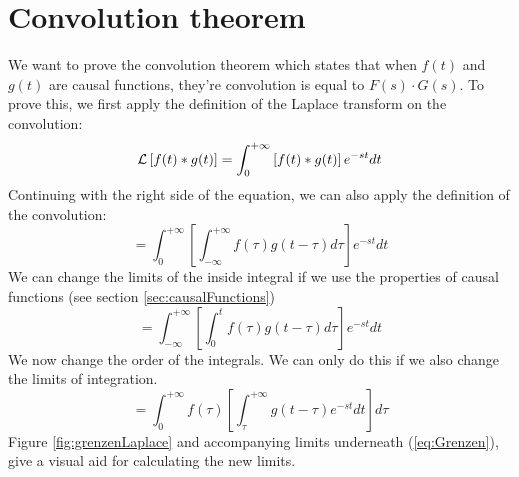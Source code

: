 \documentclass[]{subfiles}
\begin{document}
	\section{Convolution theorem}
	We want to prove the convolution theorem which states that when $f(t)$ and $g(t)$ are causal functions, they're convolution is equal to $F(s)\cdot G(s)$. To prove this, we first apply the definition of the Laplace transform on the convolution:
	\begin{equation*}
		\mathcal{L}\left[ f(t)\ast g(t)\right]  = \int_{0}^{+\infty}\left[ f(t)\ast g(t)\right] e^{-st}dt
	\end{equation*}
	Continuing with the right side of the equation, we can also apply the definition of the convolution:
	\begin{equation*}
		=\int_{0}^{+\infty}\left[ \int_{-\infty}^{+\infty}f(\tau)g(t-\tau)d\tau	\right] e^{-st}dt
	\end{equation*}
	We can change the limits of the inside integral if we use the properties of causal functions (see section \ref{sec:causalFunctions})
	\begin{equation*}
		=\int_{-\infty}^{+\infty}\left[ \int_{0}^{t}f(\tau)g(t-\tau)d\tau\right] e^{-st}dt
	\end{equation*}
	We now change the order of the integrals. We can only do this if we also change the limits of integration.
	\begin{equation*}
		=\int_{0}^{+\infty}f(\tau)\left[ \int_{\tau}^{+\infty}g(t-\tau)e^{-st}dt\right] d\tau
	\end{equation*}
	Figure \ref{fig:grenzenLaplace} and accompanying limits underneath (\ref{eq:Grenzen}), give a visual aid for calculating the new limits.
\end{document}
